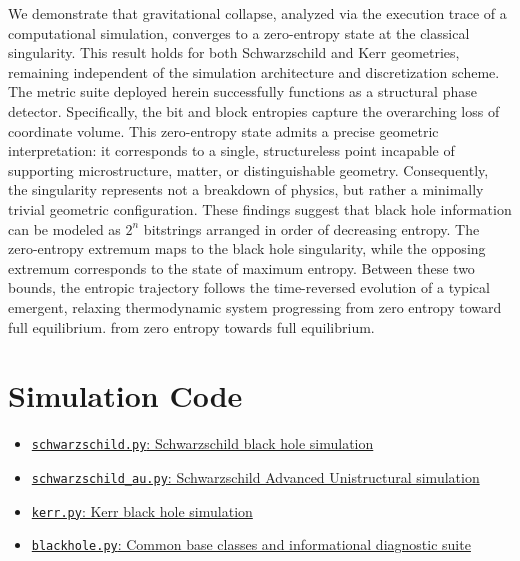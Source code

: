 \documentclass[11pt]{article}
\begin{document}
We demonstrate that gravitational collapse, analyzed via the execution trace of a computational simulation, converges to a zero-entropy state at the classical singularity.
This result holds for both Schwarzschild and Kerr geometries, remaining independent of the simulation architecture and discretization scheme.
The metric suite deployed herein successfully functions as a structural phase detector.
Specifically, the bit and block entropies capture the overarching loss of coordinate volume.
This zero-entropy state admits a precise geometric interpretation: it corresponds to a single, structureless point incapable of supporting microstructure, matter, or distinguishable geometry.
Consequently, the singularity represents not a breakdown of physics, but rather a minimally trivial geometric configuration.
These findings suggest that black hole information can be modeled as $2^n$ bitstrings arranged in order of decreasing entropy.
The zero-entropy extremum maps to the black hole singularity, while the opposing extremum corresponds to the state of maximum entropy.
Between these two bounds, the entropic trajectory follows the time-reversed evolution of a typical emergent, relaxing thermodynamic system progressing from zero entropy toward full equilibrium.
from zero entropy towards full equilibrium.


\section*{Simulation Code}

\begin{itemize}
    \item \href{simulations/schwarzschild.py}{\texttt{schwarzschild.py}:
          Schwarzschild black hole simulation}
    \item \href{simulations/schwarzschild_au.py}{\texttt{schwarzschild\_au.py}:
          Schwarzschild Advanced Unistructural simulation}
    \item \href{simulations/kerr.py}{\texttt{kerr.py}:
          Kerr black hole simulation}
    \item \href{simulations/blackhole.py}{\texttt{blackhole.py}:
          Common base classes and informational diagnostic suite}
\end{itemize}

\printbibliography
\end{document}
